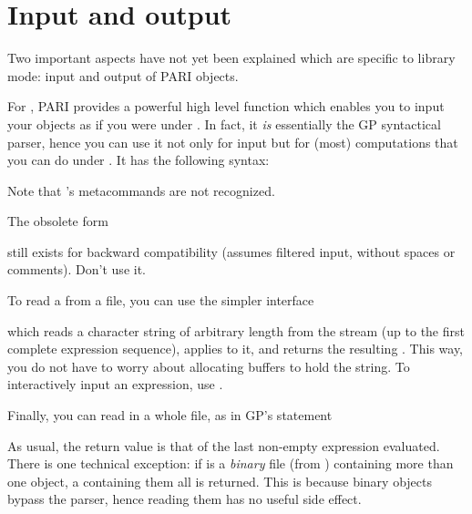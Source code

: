 \section{Input and output}

\noindent
Two important aspects have not yet been explained which are specific to
library mode: input and output of PARI objects.


\noindent
For , PARI provides a powerful high level function
which enables you to input your objects as if you were under . In fact,
it \emph{is} essentially the GP syntactical parser, hence you can use it not
only for input but for (most) computations that you can do under .
It has the following syntax:\label{se:gp_read_str}


\noindent
Note that 's metacommands are not recognized.

 The obsolete form


still exists for backward compatibility (assumes filtered input, without
spaces or comments). Don't use it.

To read a  from a file, you can use the simpler interface


\noindent which reads a character string of arbitrary length from the stream
 (up to the first complete expression sequence), applies
 to it, and returns the resulting . This way, you
do not have to worry about allocating buffers to hold the string. To
interactively input an expression, use .

Finally, you can read in a whole file, as in GP's  statement


\noindent As usual, the return value is that of the last non-empty expression
evaluated. There is one technical exception: if  is a \emph{binary}
file (from ) containing more than one object, a 
containing them all is returned. This is because binary objects bypass the
parser, hence reading them has no useful side effect.


